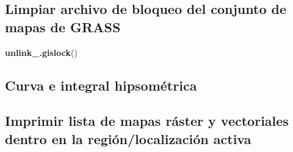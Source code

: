 \documentclass[11pt,]{article}
\newenvironment{Shaded}{\begin{snugshade}}{\end{snugshade}}
\newcommand{\KeywordTok}[1]{\textcolor[rgb]{0.13,0.29,0.53}{\textbf{#1}}}
\newcommand{\DataTypeTok}[1]{\textcolor[rgb]{0.13,0.29,0.53}{#1}}
\newcommand{\StringTok}[1]{\textcolor[rgb]{0.31,0.60,0.02}{#1}}
\newcommand{\OtherTok}[1]{\textcolor[rgb]{0.56,0.35,0.01}{#1}}
\newcommand{\OperatorTok}[1]{\textcolor[rgb]{0.81,0.36,0.00}{\textbf{#1}}}
\newcommand{\NormalTok}[1]{#1}
\begin{document}
\subsection{Limpiar archivo de bloqueo del conjunto de mapas de
GRASS}\label{limpiar-archivo-de-bloqueo-del-conjunto-de-mapas-de-grass-3}

\begin{Shaded}
\begin{Highlighting}[]
\KeywordTok{unlink_.gislock}\NormalTok{()}
\end{Highlighting}
\end{Shaded}

\subsection{Curva e integral
hipsométrica}\label{curva-e-integral-hipsomuxe9trica}

\begin{Shaded}
\end{Shaded}

\begin{Shaded}
\end{Shaded}

\subsection{Imprimir lista de mapas ráster y vectoriales dentro en la
región/localización
activa}\label{imprimir-lista-de-mapas-ruxe1ster-y-vectoriales-dentro-en-la-regiuxf3nlocalizaciuxf3n-activa-2}
\end{document}
